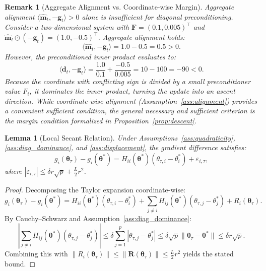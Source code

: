 \documentclass[11pt,a4paper]{article}
\newtheorem{lemma}{Lemma}
\newtheorem{remark}{Remark}
\begin{document}
\begin{remark}[Aggregate Alignment vs. Coordinate-wise Margin]
Aggregate alignment $\langle \hat{\mathbf{m}}_t, -\mathbf{g}_t \rangle > 0$ alone is insufficient for diagonal preconditioning. Consider a two-dimensional system with $\mathbf{F} = (0.1, 0.005)^\top$ and $\hat{\mathbf{m}}_t \odot (-\mathbf{g}_t) = (1.0, -0.5)^\top$. Aggregate alignment holds:
\[
\langle \hat{\mathbf{m}}_t, -\mathbf{g}_t \rangle = 1.0 - 0.5 = 0.5 > 0.
\]
However, the preconditioned inner product evaluates to:
\[
\langle \mathbf{d}_t, -\mathbf{g}_t \rangle = \frac{1.0}{0.1} + \frac{-0.5}{0.005} = 10 - 100 = -90 < 0.
\]
Because the coordinate with conflicting sign is divided by a small preconditioner value $F_i$, it dominates the inner product, turning the update into an ascent direction. While coordinate-wise alignment (Assumption~\ref{ass:alignment}) provides a convenient sufficient condition, the general necessary and sufficient criterion is the margin condition formalized in Proposition~\ref{prop:descent}.
\end{remark}

\begin{lemma}[Local Secant Relation]
\label{lem:secant}
Under Assumptions~\ref{ass:quadraticity}, \ref{ass:diag_dominance}, and \ref{ass:displacement}, the gradient difference satisfies:
\begin{equation}
g_i(\boldsymbol{\theta}_\tau) - g_i(\boldsymbol{\theta}^*) = H_{ii}(\boldsymbol{\theta}^*)(\theta_{\tau,i} - \theta_i^*) + \varepsilon_{i,\tau},
\end{equation}
where $|\varepsilon_{i,\tau}| \le \delta r \sqrt{p} + \frac{L}{2} r^2$.
\end{lemma}

\begin{proof}
Decomposing the Taylor expansion coordinate-wise:
\begin{equation}
g_i(\boldsymbol{\theta}_\tau) - g_i(\boldsymbol{\theta}^*) = H_{ii}(\boldsymbol{\theta}^*)(\theta_{\tau,i} - \theta_i^*) + \sum_{j \ne i} H_{ij}(\boldsymbol{\theta}^*)(\theta_{\tau,j} - \theta_j^*) + R_i(\boldsymbol{\theta}_\tau).
\end{equation}
By Cauchy--Schwarz and Assumption~\ref{ass:diag_dominance}:
\begin{equation}
\left| \sum_{j \ne i} H_{ij}(\boldsymbol{\theta}^*)(\theta_{\tau,j} - \theta_j^*) \right| \le \delta \sum_{j=1}^p |\theta_{\tau,j} - \theta_j^*| \le \delta \sqrt{p} \|\boldsymbol{\theta}_\tau - \boldsymbol{\theta}^*\| \le \delta r \sqrt{p}.
\end{equation}
Combining this with $\|R_i(\boldsymbol{\theta}_\tau)\| \le \|\mathbf{R}(\boldsymbol{\theta}_\tau)\| \le \frac{L}{2} r^2$ yields the stated bound.
\end{proof}
\end{document}
